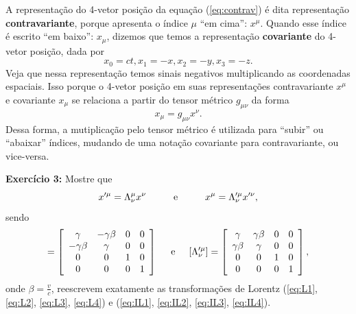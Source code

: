 \documentclass[12pt,a4paper,titlepage,brazil]{article}
\begin{document}
A representação do 4-vetor posição da equação (\ref{eq:contrav}) é dita representação {\bf contravariante}, porque apresenta o índice $\mu$ ``em cima'': $x^{\mu}$. Quando esse índice é escrito ``em baixo'': $x_{\mu}$, dizemos que temos a representação {\bf covariante} do 4-vetor posição, dada por
\begin{equation}
 x_0 = c t, x_1 = - x, x_2 = - y, x_3 = - z .
\end{equation}
Veja que nessa representação temos sinais negativos multiplicando as coordenadas espaciais. Isso porque o 4-vetor posição em suas representações contravariante $x^{\mu}$ e covariante $x_{\mu}$ se relaciona a partir do tensor métrico $g_{\mu \nu}$ da forma
\begin{equation}
 x_{\mu} = g_{\mu \nu} x^{\nu} .
\end{equation}
Dessa forma, a mutiplicação pelo tensor métrico é utilizada para ``subir'' ou ``abaixar'' índices, mudando de uma notação covariante para contravariante, ou vice-versa.\\

\begin{tcolorbox}
  {\bf Exercício 3:} Mostre que
  \begin{equation}
   x'^{\mu} = \Lambda^{\mu}_{\nu} x^{\nu} \hspace{1cm}\textnormal{e}\hspace{1cm} x^{\mu} = \Lambda'^{\mu}_{\nu} x'^{\nu} ,
 \end{equation}
 sendo
 \begin{equation}
   [\Lambda^{\mu}_{\nu}] = \left[\begin{array}{cccc}
                                   \gamma & - \gamma \beta & 0 & 0\\
                                   - \gamma \beta & \gamma & 0 & 0\\
                                   0 & 0 & 1 & 0\\
                                   0 & 0 & 0 & 1\end{array}\right]
   \hspace{0.5cm}\textnormal{e}\hspace{0.5cm}
   [\Lambda'^{\mu}_{\nu}] = \left[\begin{array}{cccc}
                                   \gamma & \gamma \beta & 0 & 0\\
                                   \gamma \beta & \gamma & 0 & 0\\
                                   0 & 0 & 1 & 0\\
                                   0 & 0 & 0 & 1\end{array}\right] ,
 \end{equation}
 onde $\beta = \frac{v}{c}$, reescrevem exatamente as transformações de Lorentz (\ref{eq:L1}, \ref{eq:L2}, \ref{eq:L3}, \ref{eq:L4}) e (\ref{eq:IL1}, \ref{eq:IL2}, \ref{eq:IL3}, \ref{eq:IL4}). 
\end{tcolorbox}
\end{document}
